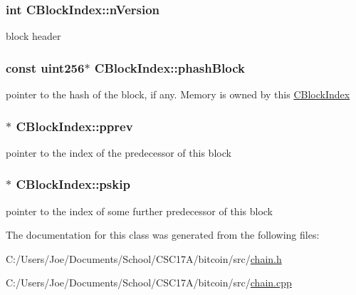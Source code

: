 \hypertarget{class_c_block_index_a45126301a0a6e26010527a7bbfc1ef58}{}
\subsubsection[{n\+Version}]{\setlength{\rightskip}{0pt plus 5cm}int C\+Block\+Index\+::n\+Version}\label{class_c_block_index_a45126301a0a6e26010527a7bbfc1ef58}


block header 

\hypertarget{class_c_block_index_afac8099e03ffda463c7153ca82d37b66}{}
\subsubsection[{phash\+Block}]{\setlength{\rightskip}{0pt plus 5cm}const {\bf uint256}$\ast$ C\+Block\+Index\+::phash\+Block}\label{class_c_block_index_afac8099e03ffda463c7153ca82d37b66}


pointer to the hash of the block, if any. Memory is owned by this \hyperlink{class_c_block_index}{C\+Block\+Index} 

\hypertarget{class_c_block_index_a1ef11137155df1dd5c81491630cece39}{}
\subsubsection[{pprev}]{$\ast$ C\+Block\+Index\+::pprev}\label{class_c_block_index_a1ef11137155df1dd5c81491630cece39}


pointer to the index of the predecessor of this block 

\hypertarget{class_c_block_index_ab6242bb77bc01617f5b402d14e6a3883}{}
\subsubsection[{pskip}]{$\ast$ C\+Block\+Index\+::pskip}\label{class_c_block_index_ab6242bb77bc01617f5b402d14e6a3883}


pointer to the index of some further predecessor of this block 



The documentation for this class was generated from the following files\+:\begin{DoxyCompactItemize}
\item 
C\+:/\+Users/\+Joe/\+Documents/\+School/\+C\+S\+C17\+A/bitcoin/src/\hyperlink{chain_8h}{chain.\+h}\item 
C\+:/\+Users/\+Joe/\+Documents/\+School/\+C\+S\+C17\+A/bitcoin/src/\hyperlink{chain_8cpp}{chain.\+cpp}\end{DoxyCompactItemize}
